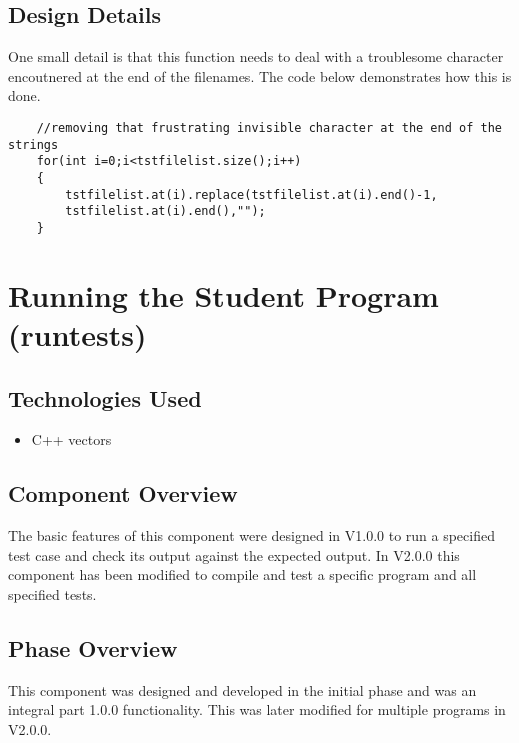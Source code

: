 \subsection{Design Details}
One small detail is that this function needs to deal with a troublesome character encoutnered at the end of the filenames. The code below demonstrates how this is done.

\begin{lstlisting}
    //removing that frustrating invisible character at the end of the strings
    for(int i=0;i<tstfilelist.size();i++)
    {
        tstfilelist.at(i).replace(tstfilelist.at(i).end()-1,
        tstfilelist.at(i).end(),"");
    }
\end{lstlisting}



\section{Running the Student Program (runtests)}


\subsection{Technologies  Used}
\begin{itemize}
    \item C++ vectors
\end{itemize}

\subsection{Component  Overview}
The basic features of this component were designed in V1.0.0 to run a specified test case and check its output against the expected output.  In V2.0.0 this component has been modified to compile and test a specific program and all specified tests.
\subsection{Phase Overview}
This component was designed and developed in the initial phase and was an integral part 1.0.0 functionality.  This was later modified for multiple programs in V2.0.0.




